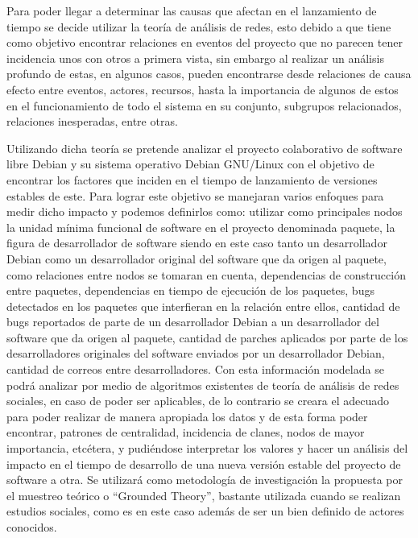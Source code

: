\documentclass[12pt,titlepage]{report}
\begin{document}
\begin{comment}
- Mencionar brevemente que hay estudios que indican que el desarrollo de SL son proyectos humano-sociales en red(causa)
- Mencionar que el SNA puede ser utilizado para este tipo de relaciones (consequencia))
\end{comment}
Para poder llegar a determinar las causas que afectan en el
lanzamiento de tiempo se decide utilizar la teoría de análisis de
redes, esto debido a que tiene como objetivo encontrar relaciones en
eventos del proyecto que no parecen tener incidencia unos con otros a
primera vista, sin embargo al realizar un análisis profundo de estas,
en algunos casos, pueden encontrarse desde relaciones de causa efecto
entre eventos, actores, recursos, hasta la importancia de algunos de
estos en el funcionamiento de todo el sistema en su conjunto,
subgrupos relacionados, relaciones inesperadas, entre otras.

Utilizando dicha teoría se pretende analizar el proyecto colaborativo
de software libre Debian y su sistema operativo Debian GNU/Linux con
el objetivo de encontrar los factores que inciden en el tiempo de
lanzamiento de versiones estables de este.  Para lograr este objetivo
se manejaran varios enfoques para medir dicho impacto y podemos
definirlos como: utilizar como principales nodos la unidad mínima
funcional de software en el proyecto denominada paquete, la figura de
desarrollador de software siendo en este caso tanto un desarrollador
Debian como un desarrollador original del software que da origen al
paquete, como relaciones entre nodos se tomaran en cuenta,
dependencias de construcción entre paquetes, dependencias en tiempo de
ejecución de los paquetes, bugs detectados en los paquetes que
interfieran en la relación entre ellos, cantidad de bugs reportados de
parte de un desarrollador Debian a un desarrollador del software que
da origen al paquete, cantidad de parches aplicados por parte de los
desarrolladores originales del software enviados por un desarrollador
Debian, cantidad de correos entre desarrolladores.  Con esta
información modelada se podrá analizar por medio de algoritmos
existentes de teoría de análisis de redes sociales, en caso de poder
ser aplicables, de lo contrario se creara el adecuado para poder
realizar de manera apropiada los datos y de esta forma poder
encontrar, patrones de centralidad, incidencia de clanes, nodos de
mayor importancia, etcétera, y pudiéndose interpretar los valores y
hacer un análisis del impacto en el tiempo de desarrollo de una nueva
versión estable del proyecto de software a otra.  Se utilizará como
metodología de investigación la propuesta por el muestreo teórico o
``Grounded Theory'', bastante utilizada cuando se realizan estudios
sociales, como es en este caso además de ser un bien definido de
actores conocidos.
\end{document}
